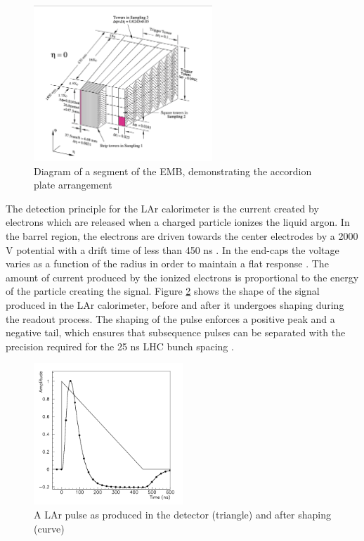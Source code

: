 \begin{figure}
        \centering
	\includegraphics[width=0.6\textwidth]{figures/ch3/lar_accordion.png}
	\caption{Diagram of a segment of the EMB, demonstrating the accordion plate arrangement \cite{lar_tdr}}
	\label{fig:lar_accordion}
\end{figure}

The detection principle for the LAr calorimeter is the current created by electrons which are released when a charged particle ionizes the liquid argon. In the barrel region, the electrons are driven towards the center electrodes by a 2000 V potential with a drift time of less than 450 ns \cite{lar_overview}. In the end-caps the voltage varies as a function of the radius in order to maintain a flat response \cite{lar_tdr}. The amount of current produced by the ionized electrons is proportional to the energy of the particle creating the signal. Figure \ref{fig:lar_pulse} shows the shape of the signal produced in the LAr calorimeter, before and after it undergoes shaping during the readout process. The shaping of the pulse enforces a positive peak and a negative tail, which ensures that subsequence pulses can be separated with the precision required for the 25 ns LHC bunch spacing \cite{lar_tdr}. \par

\begin{figure}
        \centering
	\includegraphics[width=0.5\textwidth]{figures/ch3/lar_pulse.png}
	\caption{A LAr pulse as produced in the detector (triangle) and after shaping (curve) \cite{lar_tdr}}
	\label{fig:lar_pulse}
\end{figure}

